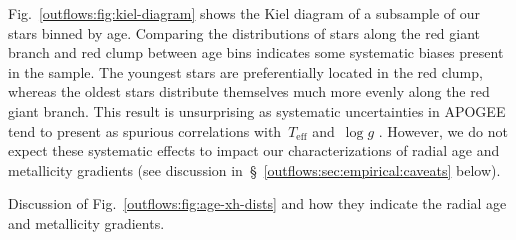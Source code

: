 Fig.~\ref{outflows:fig:kiel-diagram} shows the Kiel diagram of a subsample of
our stars binned by age.
Comparing the distributions of stars along the red giant branch and red clump
between age bins indicates some systematic biases present in the sample.
The youngest stars are preferentially located in the red clump, whereas the
oldest stars distribute themselves much more evenly along the red giant branch.
This result is unsurprising as systematic uncertainties in APOGEE tend to
present as spurious correlations with~$T_\text{eff}$ and~$\log g$
\citep[e.g.,][]{Joensson2018, Eilers2022}.
However, we do not expect these systematic effects to impact our
characterizations of radial age and metallicity gradients (see discussion
in~\S~\ref{outflows:sec:empirical:caveats} below).


{\color{red} Discussion of Fig.~\ref{outflows:fig:age-xh-dists} and how they
indicate the radial age and metallicity gradients.}

